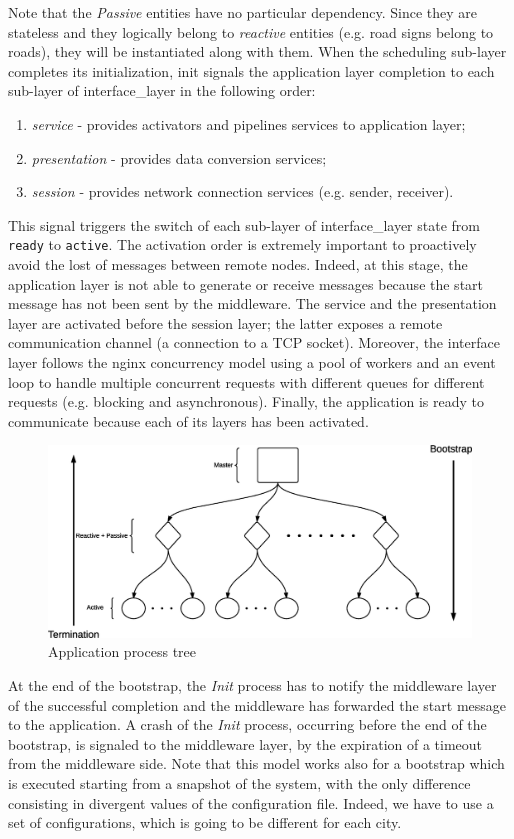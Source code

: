 Note that the \textit{Passive} entities have no particular dependency. Since
they are stateless and they logically belong to \textit{reactive} entities
(e.g. road signs belong to roads), they will be instantiated along with them.
When the scheduling sub-layer completes its initialization, init signals
the application layer completion to each sub-layer of interface\_layer in the
following order:
\begin{enumerate}
	\item \textit{service} - provides activators and pipelines services to
	application layer;
	\item \textit{presentation} - provides data conversion services;
	\item \textit{session} - provides network connection services
	(e.g. sender, receiver).
\end{enumerate}
This signal triggers the switch of each sub-layer of interface\_layer state from
\verb|ready| to \verb|active|.
The activation order is extremely important to
proactively avoid the lost of messages between remote nodes. Indeed, at this
stage, the application layer is not able to generate or receive messages
because the start message has not been sent by the middleware.
The service and
the presentation layer are activated before the session layer; the latter
exposes a remote communication channel (a connection to a TCP socket).
Moreover, the interface layer follows the nginx concurrency model using a
pool of workers and an event loop to handle multiple concurrent requests
with different queues for different requests (e.g. blocking and asynchronous).
Finally, the application is ready to communicate because each of its layers
has been activated.

\begin{figure}[H]
  \centering
  \includegraphics[width=\columnwidth]{images/solution/app_proc_tree.eps}
  \caption{Application process tree}
  \label{fig:app-proc-tree}
\end{figure}

At the end of the bootstrap, the \textit{Init} process has to notify the
middleware layer of the successful completion and the middleware has forwarded
the start message to the application. A crash of the
\textit{Init} process, occurring before the end of the bootstrap,
is signaled to the middleware layer, by the expiration of a timeout from the
middleware side.
Note that this model works also for a bootstrap which is executed starting
from a snapshot of the system, with the only difference consisting in divergent
values of the configuration file. Indeed, we have to use a set of
configurations, which is going to be different for each city.